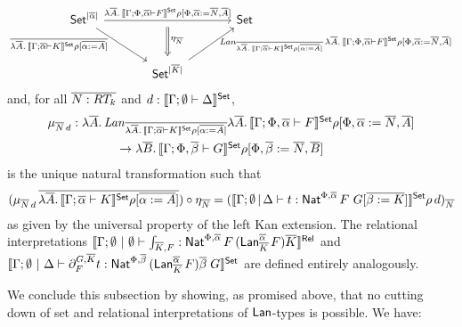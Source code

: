 \documentclass{lmcs}
\theoremstyle{plain}\newtheorem{satz}[thm]{Satz}
\newcommand{\set}{\mathsf{Set}}
\begin{document}
\vspace*{-0.1in}

\[\begin{tikzcd} [column sep = large, row sep = large]
\set^{|\ol \alpha|}
\ar[rr, "\lambda \ol{A}.\,\setsem{\Gamma; \Phi, \ol\alpha
    \vdash F}\rho {[\Phi, \ol \alpha := \ol{N}, \ol{A} ]}"{name=F}] 
\ar[dr, "\ol{\lambda \ol{A}.\,\setsem{\Gamma; \ol\alpha \vdash
      K}\rho {[\ol{\alpha := A} ]}}\;\;\;\;"{left}] && \set \\  
&\set^{|\ol K|} \ar[ur, "\;\;\mathit{Lan}_{\ol{\lambda \ol A.\,
      \setsem{\Gamma; \ol\alpha \vdash K}\rho {[\ol{\alpha := A}
  ]}}}\, \lambda \ol A.\, \setsem{\Gamma; \Phi, \ol\alpha \vdash
    F}\rho {[\Phi, \ol \alpha :=  \ol N, \ol A ]}"{right}]
\ar[d, Rightarrow, shorten <= 2mm, shorten >= 1mm, 
          from=F, to=2-2,  "\eta_{\ol{N}}"{}]
\end{tikzcd}\]
and, for all $\overline{N : RT_k}$ and $d : \setsem{\Gamma;\emptyset \vdash
  \Delta}$,
\[\begin{array}{l}
\mu_{\ol{N}\, d} : \lambda \ol{A}.\,
\mathit{Lan}_{\ol{\lambda \ol A.\,\setsem{\Gamma; \ol\alpha \vdash K}\rho 
  {[\ol{\alpha := A} ]}}} \lambda \ol A.\,\setsem{\Gamma; \Phi,
  \ol\alpha \vdash F}\rho {[\Phi, \ol \alpha := \ol N, \ol A ]}\\[2ex]
\hspace*{0.8in}\to \lambda \ol B.\, \setsem{\Gamma; 
  \Phi, \ol\beta \vdash G} \rho[\Phi, \ol \beta := \ol N, \ol B]
\end{array}\]
is the unique natural transformation such that
\begin{equation}\label{eq:defn-of-mu-sub-N}
(\mu_{\ol{N}\, d} \, \ol{\lambda \ol A.\,\setsem{\Gamma; \ol\alpha \vdash K}
  \rho[\ol{\alpha := A}]}) \circ \eta_{\ol{N}}
= (\setsem{\Gamma; \emptyset \,|\, \Delta \vdash t : \Nat^{\Phi,
  \ol\alpha} \, F \,\, G[\ol{\beta := K}]}\rho \, d)_{\ol{N}}
\end{equation}
as given by the universal property of the left Kan extension.  The
relational interpretations $\llbracket{\Gamma;\emptyset~|~\emptyset
  \vdash \int_{\overline{K},F} : \mathsf{Nat}^{\Phi, \overline{\alpha}}\, F\,
  (\mathsf{Lan}^{\overline{\alpha}}_{\overline{K}}\, F) \overline{K}}\rrbracket^{\mathsf{Rel}}$ and
$\setsem{\Gamma;\emptyset~|~\Delta \vdash \partial^{G, \ol K}_F t :
  \Nat^{\Phi, \ol\beta}\, (\Lan^{\ol\alpha}_{\ol K}\,F) \ol \beta\;
  G}$ are defined entirely analogously.

\vspace*{0.05in}

We conclude this subsection by showing, as promised above, that no
cutting down of set and relational interpretations of $\mathsf{Lan}$-types is
possible. We have:
\end{document}
